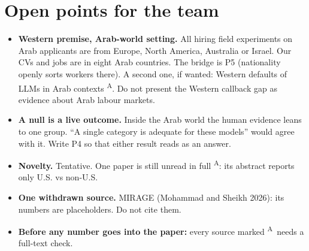 \documentclass[11pt]{article}
\newcommand{\vA}{\textsuperscript{A}} %
\newcommand{\slot}[1]{\textbf{#1}}
\begin{document}
\section{Open points for the team}

\begin{itemize}
\item \slot{Western premise, Arab-world setting.} All hiring field experiments on Arab applicants are from Europe, North America, Australia or Israel. Our CVs and jobs are in eight Arab countries. The bridge is P5 (nationality openly sorts workers there). A second one, if wanted: Western defaults of LLMs in Arab contexts \citep{naous2024beer}\vA. Do not present the Western callback gap as evidence about Arab labour markets.
\item \slot{A null is a live outcome.} Inside the Arab world the human evidence leans to one group. ``A single category is adequate for these models'' would agree with it. Write P4 so that either result reads as an answer.
\item \slot{Novelty.} Tentative. One paper is still unread in full \citep{bilon2025sociodemographic}\vA: its abstract reports only U.S. vs non-U.S.
\item \slot{One withdrawn source.} MIRAGE (Mohammad and Sheikh 2026): its numbers are placeholders. Do not cite them.
\item \slot{Before any number goes into the paper:} every source marked \vA\ needs a full-text check.
\end{itemize}


\end{document}
